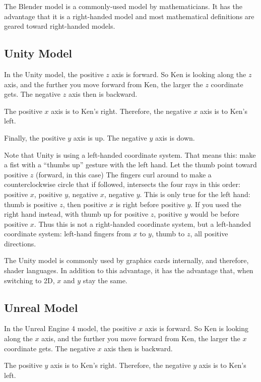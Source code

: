 \documentclass[letter,12pt]{article}
\begin{document}
The Blender model is a commonly-used model by mathematicians.  It has the advantage that it is a right-handed model and most mathematical definitions are geared toward right-handed models.


\subsection{Unity Model}

In the Unity model, the positive $z$ axis is forward.  So Ken is looking along the $z$ axis, and the further you move forward from Ken, the larger the $z$ coordinate gets.  The negative $z$ axis then is backward.

The positive $x$ axis is to Ken’s right.  Therefore, the negative $x$ axis is to Ken’s left.

Finally, the positive $y$ axis is up.  The negative $y$ axis is down.

Note that Unity is using a left-handed coordinate system.  That means this: make a fist with a “thumbs up” gesture with the left hand.  Let the thumb point toward positive $z$ (forward, in this case) The fingers curl around to make a counterclockwise circle that if followed, intersects the four rays in this order: positive $x$, positive $y$, negative $x$, negative $y$.   This is only true for the left hand: thumb is positive $z$, then positive $x$ is right before positive $y$.  If you used the right hand instead, with thumb up for positive $z$, positive $y$ would be before positive $x$.  Thus this is not a right-handed coordinate system, but a left-handed coordinate system: left-hand fingers from $x$ to $y$, thumb to $z$, all positive directions.

The Unity model is commonly used by graphics cards internally, and therefore, shader languages.  In addition to this advantage, it has the advantage that, when switching to 2D, $x$ and $y$ stay the same.


\subsection{Unreal Model}

In the Unreal Engine 4 model, the positive $x$ axis is forward.  So Ken is looking along the $x$ axis, and the further you move forward from Ken, the larger the $x$ coordinate gets.  The negative $x$ axis then is backward.

The positive $y$ axis is to Ken’s right.  Therefore, the negative $y$ axis is to Ken’s left.
\end{document}
